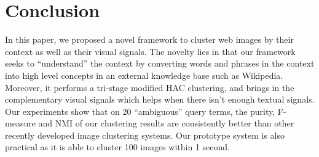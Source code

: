 \section{Conclusion}
\label{sec:conclude}
In this paper, we proposed a novel framework to cluster web images by their
context as well as their visual signals. The novelty lies in that
our framework seeks to ``understand'' the context by converting words
and phrases in the context into high level concepts in an external knowledge
base such as Wikipedia. Moreover, it performs a tri-stage modified HAC clustering,
and brings in the complementary
visual signals which helps when there isn't enough textual signals. Our experiments
show that on 20 ``ambiguous'' query terms, the purity, F-measure and NMI
of our clustering results are
consistently better than other recently developed image clustering systems.
Our prototype system is also practical as it is able to cluster 100 images
within 1 second.
